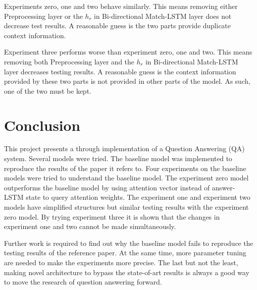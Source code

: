 \documentclass[modernstyle,12pt]{sjsuthesis}
\theoremstyle{definition}
\begin{document}
Experiments zero, one and two behave similarly. This means removing either Preprocessing layer or the $h_r$ in Bi-directional Match-LSTM layer does not decrease test results. A reasonable guess is the two parts provide duplicate context information.

Experiment three performs worse than experiment zero, one and two. This means removing both Preprocessing layer and the $h_r$ in Bi-directional Match-LSTM layer decreases testing results. A reasonable guess is the context information provided by these two parts is not provided in other parts of the model. As such, one of the two must be kept.





\chapter{Conclusion}

This project presents a through implementation of a Question Answering (QA) system. Several models were tried. The baseline model was implemented to reproduce the results of the paper it refers to. Four experiments on the baseline models were tried to understand the baseline model. The experiment zero model outperforms the baseline model by using attention vector instead of answer-LSTM state to query attention weights. The experiment one and experiment two models have simplified structures but similar testing results with the experiment zero model. By trying experiment three it is shown that the changes in experiment one and two cannot be made simultaneously.

Further work is required to find out why the baseline model fails to reproduce the testing results of the reference paper. At the same time, more parameter tuning are needed to make the experiments more precise. The last but not the least, making novel architecture to bypass the state-of-art results is always a good way to move the research of question answering forward.



%
%
%


\end{document}
